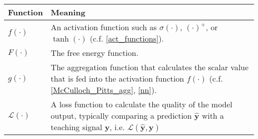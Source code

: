 \begin{tabular}{ p{3cm} p{11cm} }
	\textbf{Function} & \textbf{Meaning}\\
	\hline
	$f(\cdot)$ & An activation function such as $\sigma(\cdot)$, $(\cdot)^{+}$, or $\tanh(\cdot)$ (c.f. \eqref{act_functions}).\\
    $F(\cdot)$ & The free energy function.\\
	$g(\cdot)$ & The aggregation function that calculates the scalar value that is fed into the activation function $f(\cdot)$ (c.f. \eqref{McCulloch_Pitts_agg},  \eqref{nn}).\\
    $\mathcal{L}(\cdot)$ & A loss function to calculate the quality of the model output, typically comparing a prediction $\boldsymbol{\hat{y}}$ with a teaching signal $\boldsymbol{y}$, i.e. $\mathcal{L}(\boldsymbol{\hat{y}}, \boldsymbol{y})$\\
\end{tabular}
\renewcommand{\arraystretch}{1}







